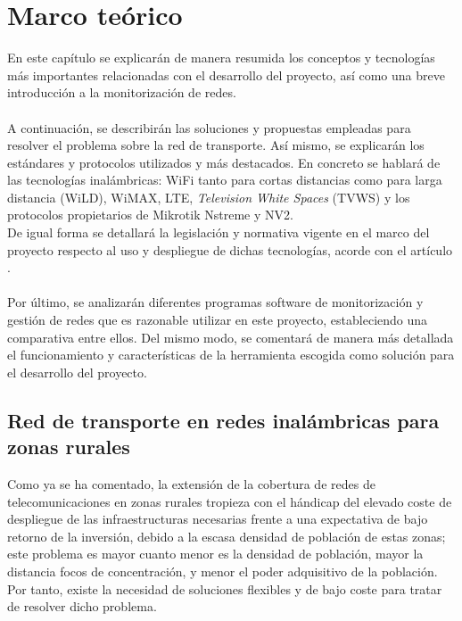\chapter{Marco teórico}
\label{cap:marco_teorico}
	En este capítulo se explicarán de manera resumida los conceptos y tecnologías más importantes relacionadas con el desarrollo del proyecto, así como una breve introducción a la monitorización de redes.\\\\
	
	A continuación, se describirán las soluciones y propuestas empleadas para resolver el problema sobre la red de transporte. Así mismo, se explicarán los estándares y protocolos utilizados y más destacados. En concreto se hablará de las tecnologías inalámbricas: WiFi tanto para cortas distancias como para larga distancia (WiLD), WiMAX, LTE, \textit{Television White Spaces} (TVWS) y los protocolos propietarios de Mikrotik \cite{Mikrotik} Nstreme y NV2.\\
	De igual forma se detallará la legislación y normativa vigente en el marco del proyecto respecto al uso y despliegue de dichas tecnologías, acorde con el artículo \cite{espinoza2018wireless}.\\\\
	
	Por último, se analizarán diferentes programas software de monitorización y gestión de redes que es razonable utilizar en este proyecto, estableciendo una comparativa entre ellos. Del mismo modo, se comentará de manera más detallada el funcionamiento y características de la herramienta escogida como solución para el desarrollo del proyecto.
	
\section{Red de transporte en redes inalámbricas para zonas rurales}
	Como ya se ha comentado, la extensión de la cobertura de redes de telecomunicaciones en zonas rurales tropieza con el hándicap del elevado coste de despliegue de las infraestructuras necesarias frente a una expectativa de bajo retorno de la inversión, debido a la escasa densidad de población de estas zonas; este problema es mayor cuanto menor es la densidad de población, mayor la distancia focos de concentración, y menor el poder adquisitivo de la población. Por tanto, existe la necesidad de soluciones flexibles y de bajo coste para tratar de resolver dicho problema.\\\\
	

